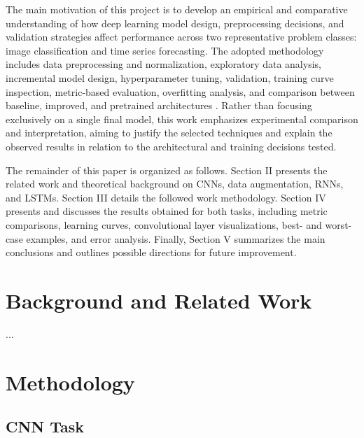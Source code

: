 \documentclass[conference]{IEEEtran}
\begin{document}
The main motivation of this project is to develop an empirical and comparative understanding of how deep learning model design, preprocessing decisions, and validation strategies affect performance across two representative problem classes: image classification and time series forecasting. The adopted methodology includes data preprocessing and normalization, exploratory data analysis, incremental model design, hyperparameter tuning, validation, training curve inspection, metric-based evaluation, overfitting analysis, and comparison between baseline, improved, and pretrained architectures \cite{b10}. Rather than focusing exclusively on a single final model, this work emphasizes experimental comparison and interpretation, aiming to justify the selected techniques and explain the observed results in relation to the architectural and training decisions tested.

The remainder of this paper is organized as follows. Section II presents the related work and theoretical background on CNNs, data augmentation, RNNs, and LSTMs. Section III details the followed work methodology. Section IV presents and discusses the results obtained for both tasks, including metric comparisons, learning curves, convolutional layer visualizations, best- and worst-case examples, and error analysis. Finally, Section V summarizes the main conclusions and outlines possible directions for future improvement.



\section{Background and Related Work}

 ...

\section{Methodology}

\subsection{CNN Task}
 
\end{document}

